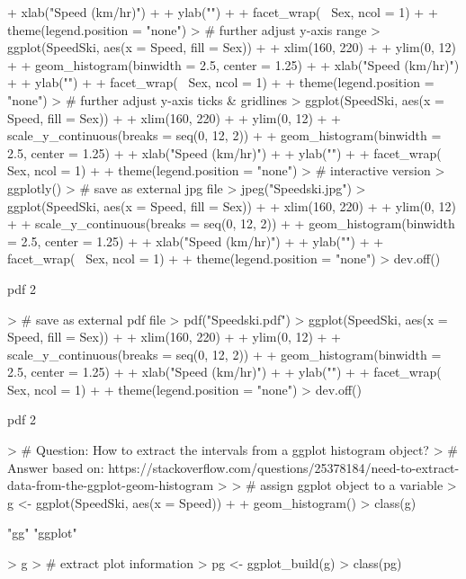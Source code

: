\documentclass[12pt,letterpaper,final]{article}
\begin{document}
\begin{Schunk}
\begin{Sinput}
+   xlab("Speed (km/hr)") + 
+   ylab("") +
+   facet_wrap(~ Sex, ncol = 1) + 
+   theme(legend.position = "none")
> # further adjust y-axis range
> ggplot(SpeedSki, aes(x = Speed, fill = Sex)) + 
+   xlim(160, 220) +
+   ylim(0, 12) +
+   geom_histogram(binwidth = 2.5, center = 1.25) + 
+   xlab("Speed (km/hr)") + 
+   ylab("") +
+   facet_wrap(~ Sex, ncol = 1) + 
+   theme(legend.position = "none")
> # further adjust y-axis ticks & gridlines
> ggplot(SpeedSki, aes(x = Speed, fill = Sex)) + 
+   xlim(160, 220) +
+   ylim(0, 12) +
+   scale_y_continuous(breaks = seq(0, 12, 2)) +
+   geom_histogram(binwidth = 2.5, center = 1.25) + 
+   xlab("Speed (km/hr)") + 
+   ylab("") +
+   facet_wrap(~ Sex, ncol = 1) + 
+   theme(legend.position = "none")
> # interactive version
> ggplotly()
> # save as external jpg file
> jpeg("Speedski.jpg")
> ggplot(SpeedSki, aes(x = Speed, fill = Sex)) + 
+   xlim(160, 220) +
+   ylim(0, 12) +
+   scale_y_continuous(breaks = seq(0, 12, 2)) +
+   geom_histogram(binwidth = 2.5, center = 1.25) + 
+   xlab("Speed (km/hr)") + 
+   ylab("") +
+   facet_wrap(~ Sex, ncol = 1) + 
+   theme(legend.position = "none")
> dev.off()
\end{Sinput}
\begin{Soutput}
pdf 
  2 
\end{Soutput}
\begin{Sinput}
> # save as external pdf file
> pdf("Speedski.pdf")
> ggplot(SpeedSki, aes(x = Speed, fill = Sex)) + 
+   xlim(160, 220) +
+   ylim(0, 12) +
+   scale_y_continuous(breaks = seq(0, 12, 2)) +
+   geom_histogram(binwidth = 2.5, center = 1.25) + 
+   xlab("Speed (km/hr)") + 
+   ylab("") +
+   facet_wrap(~ Sex, ncol = 1) + 
+   theme(legend.position = "none")
> dev.off()
\end{Sinput}
\begin{Soutput}
pdf 
  2 
\end{Soutput}
\begin{Sinput}
> # Question: How to extract the intervals from a ggplot histogram object?
> # Answer based on: https://stackoverflow.com/questions/25378184/need-to-extract-data-from-the-ggplot-geom-histogram
> 
> # assign ggplot object to a variable
> g <- ggplot(SpeedSki, aes(x = Speed)) +
+   geom_histogram()
> class(g)
\end{Sinput}
\begin{Soutput}
[1] "gg"     "ggplot"
\end{Soutput}
\begin{Sinput}
> g
> # extract plot information
> pg <- ggplot_build(g)
> class(pg)

\end{Sinput}
\end{Schunk}
\end{document}

